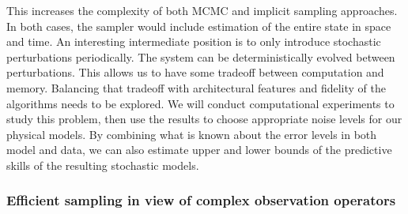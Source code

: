 \documentclass[11pt]{article}
\newcommand{\MarginPar}[1]{\marginpar{%
\vskip-\baselineskip %
\raggedright\tiny\sffamily
\hrule\smallskip{\color{red}#1}\par\smallskip\hrule}}
\begin{document}
This increases the complexity of both MCMC and implicit sampling approaches. In both cases, the sampler would 
include estimation of the entire state in space and time.
An interesting intermediate position is to only introduce stochastic perturbations periodically.  The system
can be deterministically evolved between perturbations. This allows
us to have some tradeoff between computation and memory.
Balancing that tradeoff with architectural features and fidelity of the algorithms needs to be explored.
We will conduct computational experiments to study this problem, then use the results to 
choose appropriate noise levels for our physical models.
By combining what is known about the error levels in both model and data, we can also estimate upper and lower bounds
of the predictive skills of the resulting stochastic models.

\subsubsection*{Efficient sampling in view of complex observation operators}
\end{document}
